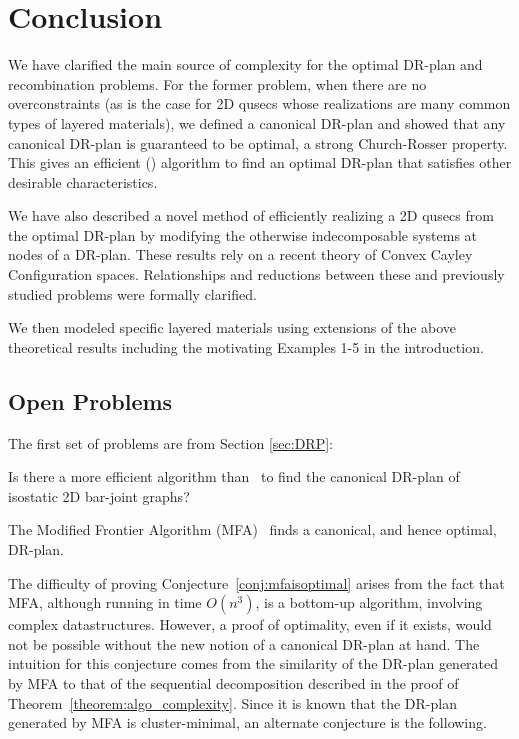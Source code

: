 \section{Conclusion}
\label{sec:conclusion}

We have clarified the main source of complexity for the optimal DR-plan and recombination problems. For the former problem, when there are no overconstraints (as is the case for 2D qusecs whose realizations are many common types of layered materials), we defined a canonical DR-plan and showed that any canonical DR-plan is guaranteed to be optimal, a strong Church-Rosser property. This gives an efficient (\candrpcomplexity) algorithm to find an optimal DR-plan that satisfies other desirable characteristics.

We have also described a novel method of efficiently realizing a 2D qusecs from the optimal DR-plan by modifying the otherwise indecomposable systems  at nodes of a DR-plan. These results rely on a recent theory of Convex Cayley Configuration spaces. Relationships and reductions between these and previously studied problems were formally clarified.

We then modeled specific layered materials using extensions of the above theoretical results including the motivating Examples 1-5 in the introduction.


\subsection{Open Problems}
\label{sec:appendix:b}
\label{sec:futurework}
\label{sec:open}

The first set of problems are from Section \ref{sec:DRP}:
\begin{openproblem}
    Is there a more efficient algorithm than \candrpcomplexityv\ to find the canonical DR-plan of isostatic 2D bar-joint graphs?
\end{openproblem}

\begin{conjecture}
\label{conj:mfaisoptimal}
    The Modified Frontier Algorithm (MFA)~\cite{lomonosov2004graph} finds a canonical, and hence optimal, DR-plan.
\end{conjecture}

The difficulty of proving Conjecture~\ref{conj:mfaisoptimal} arises from the fact that MFA, although running in time $O(n^3)$, is a bottom-up algorithm, involving complex datastructures. However, a proof of optimality, even if it exists, would not be possible without the new notion of a canonical DR-plan at hand. The intuition for this conjecture comes from the similarity of the DR-plan generated by MFA to that of the sequential decomposition described in the proof of Theorem~\ref{theorem:algo_complexity}.  Since it is known \cite{lomonosov2004graph} that the DR-plan generated by MFA is cluster-minimal, an alternate conjecture is the following.

